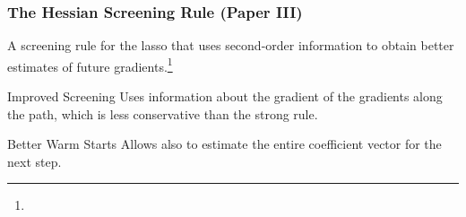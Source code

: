 \documentclass[aspectratio=1610,onlytextwidth]{beamer}
\begin{document}
\begin{frame}
  \frametitle{The Hessian Screening Rule (Paper III)}

  A screening rule for the lasso that uses second-order information to obtain better
  estimates of future gradients.\footnote[frame]{}

  \pause

  \begin{block}{Improved Screening}
    Uses information about the gradient of the gradients along the path, which is
    less conservative than the strong rule.
  \end{block}

  \pause

  \begin{block}{Better Warm Starts}
    Allows also to estimate the entire coefficient vector for the next step.
  \end{block}





\end{frame}
\end{document}
